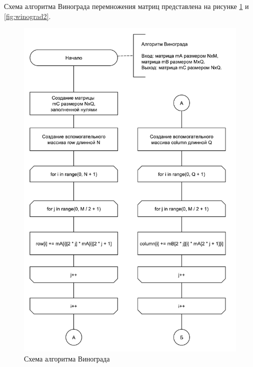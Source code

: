 Схема алгоритма Винограда перемножения матриц представлена на рисунке \ref{fig:winograd1} и \ref{fig:winograd2}.

\begin{figure}
	\centering
	\includegraphics[width=0.75\linewidth]{images/winograd1}
	\caption{Схема алгоритма Винограда}
	\label{fig:winograd1}
\end{figure}

\newpage

